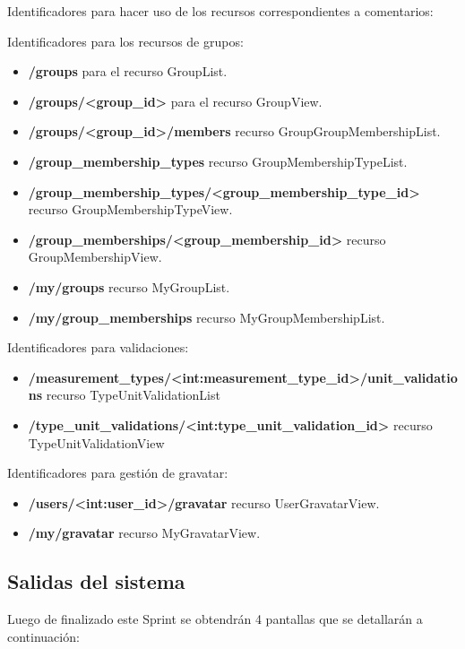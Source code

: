 Identificadores para hacer uso de los recursos correspondientes a comentarios:

Identificadores para los recursos de grupos:
\begin{itemize}
	\item \textbf{/groups} para el recurso GroupList.
	\item \textbf{/groups/<group\_id>} para el recurso GroupView.
	\item \textbf{/groups/<group\_id>/members} recurso GroupGroupMembershipList.
	\item \textbf{/group\_membership\_types} recurso GroupMembershipTypeList.
	\item \textbf{/group\_membership\_types/<group\_membership\_type\_id>} recurso GroupMembershipTypeView.
	\item \textbf{/group\_memberships/<group\_membership\_id>} recurso GroupMembershipView.
	\item \textbf{/my/groups} recurso MyGroupList.
	\item \textbf{/my/group\_memberships} recurso MyGroupMembershipList.
\end{itemize}

Identificadores para validaciones:

\begin{itemize}
	\item \textbf{/measurement\_types/<int:measurement\_type\_id>/unit\_validations} recurso TypeUnitValidationList
	\item \textbf{/type\_unit\_validations/<int:type\_unit\_validation\_id>} recurso TypeUnitValidationView 
\end{itemize}

Identificadores para gestión de gravatar:

\begin{itemize}
	\item \textbf{/users/<int:user\_id>/gravatar} recurso UserGravatarView.
	\item \textbf{/my/gravatar} recurso MyGravatarView.
\end{itemize}


\subsection{Salidas del sistema}
Luego de finalizado este Sprint se obtendrán 4 pantallas que se detallarán a continuación:

